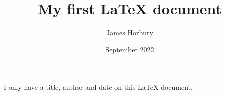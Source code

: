 \documentclass[12pt, letterpaper]{article}
\title{My first LaTeX document}
\author{James Horbury}
\date{September 2022}
\begin{document}
\maketitle
I only have a title, author and date on this \LaTeX{} document.
\end{document}
